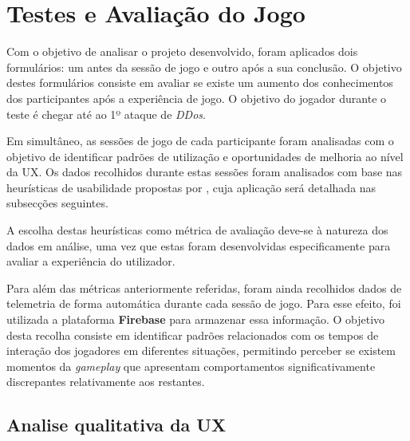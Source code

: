 \chapter{Testes e Avaliação do Jogo}

\label{cap5}

Com o objetivo de analisar o projeto desenvolvido, foram aplicados dois formulários: um antes da sessão de jogo e outro após a sua conclusão. O objetivo destes formulários consiste em avaliar se existe um aumento dos conhecimentos dos participantes após a experiência de jogo. O objetivo do jogador durante o teste é chegar até ao 1º ataque de \textit{DDos}.

Em simultâneo, as sessões de jogo de cada participante foram analisadas com o objetivo de identificar padrões de utilização e oportunidades de melhoria ao nível da \ac{UX}. Os dados recolhidos durante estas sessões foram analisados com base nas heurísticas de usabilidade propostas por \textcite{nielsen1994enhancing}, cuja aplicação será detalhada nas subsecções seguintes.

A escolha destas heurísticas como métrica de avaliação deve-se à natureza dos dados em análise, uma vez que estas foram desenvolvidas especificamente para avaliar a experiência do utilizador.

Para além das métricas anteriormente referidas, foram ainda recolhidos dados de telemetria de forma automática durante cada sessão de jogo. Para esse efeito, foi utilizada a plataforma \textbf{Firebase} para armazenar essa informação. O objetivo desta recolha consiste em identificar padrões relacionados com os tempos de interação dos jogadores em diferentes situações, permitindo perceber se existem momentos da \textit{gameplay} que apresentam comportamentos significativamente discrepantes relativamente aos restantes.

\section{Analise qualitativa da \ac{UX}}

